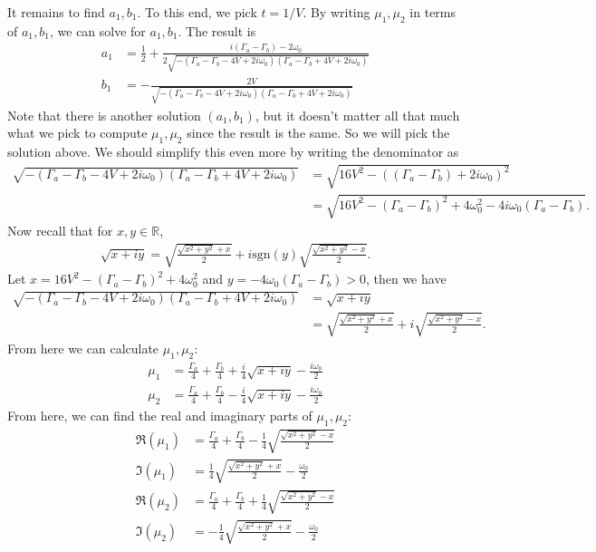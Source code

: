 \documentclass{article}
\theoremstyle{definition}
\newcommand{\f}[2]{\frac{#1}{#2}}
\begin{document}
\begin{enumerate}[label=(\alph*)]
	It remains to find $a_1,b_1$. To this end, we pick $t=1/V$. By writing $\mu_1,\mu_2$ in terms of $a_1,b_1$, we can solve for $a_1,b_1$. The result is 
	\begin{align*}
	a_1 &= \f{1}{2} + \frac{ i (\Gamma_a- \Gamma_b) - 2 \omega_0}{2 \sqrt{-(\Gamma_a-\Gamma_b-4
			V+2 i \omega_0) (\Gamma_a-\Gamma_b+4 V+2 i \omega_0)}}\\
	b_1 &= 	-\frac{2 V}{\sqrt{-(\Gamma_a-\Gamma_b-4 V+2 i \omega_0) (\Gamma_a-\Gamma_b+4 V+2 i\omega_0)}}
	\end{align*}
	Note that there is another solution $(a_1,b_1)$, but it doesn't matter all that much what we pick to compute $\mu_1,\mu_2$ since the result is the same. So we will pick the solution above. We should simplify this even more by writing the denominator as 
	\begin{align*}
	\sqrt{-(\Gamma_a-\Gamma_b-4 V+2 i \omega_0) (\Gamma_a-\Gamma_b+4 V+2 i\omega_0)}
	&= \sqrt{16V^2 - ((\Gamma_a-\Gamma_b)+2 i\omega_0)^2}\\
	&= \sqrt{16V^2 - (\Gamma_a- \Gamma_b)^2 +4 \omega_0^2  - 4i\omega_0(\Gamma_a - \Gamma_b)}.
	\end{align*}
	Now recall that for $x,y\in \mathbb{R}$, 
	\begin{align*}
	\sqrt{x+iy} = \sqrt{\f{\sqrt{x^2+y^2} + x }{2}} + i\text{sgn}(y)\sqrt{\f{\sqrt{x^2+y^2} - x}{2}}.
	\end{align*}
	Let $x = 16V^2 - (\Gamma_a- \Gamma_b)^2 +4 \omega_0^2$ and $y = -4\omega_0(\Gamma_a - \Gamma_b) > 0$, then we have
	\begin{align*}
	\sqrt{-(\Gamma_a-\Gamma_b-4 V+2 i \omega_0) (\Gamma_a-\Gamma_b+4 V+2 i\omega_0)} &= \sqrt{x+iy} \\
	&=\sqrt{\f{\sqrt{x^2+y^2} + x }{2}} + i\sqrt{\f{\sqrt{x^2+y^2} - x}{2}}.
	\end{align*}
	From here we can calculate $\mu_1,\mu_2$:
	\begin{align*}
	\mu_1 &= \f{\Gamma_a}{4} + \f{\Gamma_b}{4} + \f{i}{4}\sqrt{x+iy} - \f{i\omega_0}{2} \\
	\mu_2 &= \f{\Gamma_a}{4} + \f{\Gamma_b}{4} - \f{i}{4}\sqrt{x+iy} - \f{i\omega_0}{2} 
	\end{align*}
	From here, we can find the real and imaginary parts of $\mu_1, \mu_2$:
	\begin{align*}
	\Re(\mu_1) 
	&= \f{\Gamma_a}{4} + \f{\Gamma_b}{4} - \f{1}{4}\sqrt{\f{\sqrt{x^2+y^2} - x}{2}}\\
	\Im(\mu_1) &= \f{1}{4} \sqrt{\f{\sqrt{x^2+y^2} + x }{2}}- \f{\omega_0}{2}\\
	\Re(\mu_2) &= \f{\Gamma_a}{4} + \f{\Gamma_b}{4}  + \f{1}{4}\sqrt{\f{\sqrt{x^2+y^2} - x}{2}}\\
	\Im(\mu_2) &=  -\f{1}{4} \sqrt{\f{\sqrt{x^2+y^2} + x }{2}}- \f{\omega_0}{2}
	\end{align*}
	

\end{enumerate}
\end{document}
